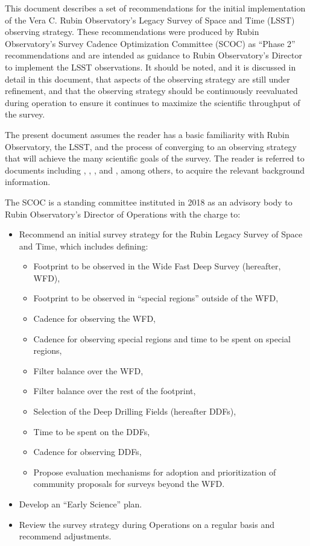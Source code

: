 This document describes a set of recommendations for the initial implementation of the Vera C. Rubin Observatory's Legacy Survey of Space and Time (LSST) observing strategy. These recommendations were produced by Rubin Observatory's Survey Cadence Optimization Committee (SCOC) as ``Phase 2'' recommendations and are intended as guidance to Rubin Observatory's Director to implement the LSST observations. It should be noted, and it is discussed in detail in this document, that aspects of the observing strategy are still under refinement, and that the observing strategy should be continuously reevaluated during operation to ensure it continues to maximize the scientific throughput of the survey.

The present document assumes the reader has a basic familiarity with Rubin Observatory, the LSST, and the process of converging to an observing strategy that will achieve the many scientific goals of the survey. The reader is referred to documents including \citealt{LPM-17}, \citealt{PSTN-051}, \citealt{PSTN-053}, and \citet{2022ApJS..258....1B}, among others, to acquire the relevant background information. 

The SCOC is a standing committee instituted in 2018 as an advisory body to Rubin Observatory's Director of Operations with the charge to:
\begin{itemize}
\item Recommend an initial survey strategy for the Rubin Legacy Survey of Space and Time, which includes defining:
\begin{itemize}
\item Footprint to be observed in the Wide Fast Deep Survey (hereafter, WFD),
\item Footprint to be observed in ``special regions'' outside of the WFD,
\item Cadence for observing the WFD,
\item Cadence for observing special regions and time to be spent on special regions,
\item Filter balance over the WFD,
\item Filter balance over the rest of the footprint,
\item Selection of the Deep Drilling Fields (hereafter DDFs),
\item Time to be spent on the DDFs,
\item Cadence for observing DDFs,
\item Propose evaluation mechanisms for adoption and prioritization of community proposals for surveys beyond the WFD.
\end{itemize}
\item Develop an ``Early Science'' plan.
\item Review the survey strategy during Operations on a regular basis and recommend adjustments.
\end{itemize}

